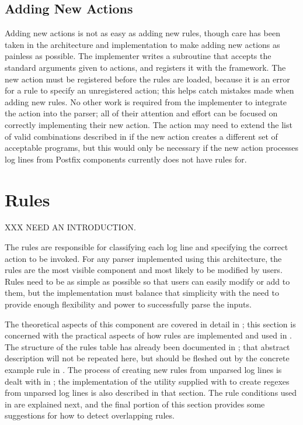 \subsection{Adding New Actions}

\label{adding new actions in implementation}

Adding new actions is not as easy as adding new rules, though care has been
taken in the architecture and implementation to make adding new actions as
painless as possible.  The implementer writes a subroutine that accepts the
standard arguments given to actions, and registers it with the framework.
The new action must be registered before the rules are loaded, because it
is an error for a rule to specify an unregistered action; this helps catch
mistakes made when adding new rules.  No other work is required from the
implementer to integrate the action into the parser; all of their attention
and effort can be focused on correctly implementing their new action.  The
action may need to extend the list of valid combinations described in
 if the new action creates a different
set of acceptable programs, but this would only be necessary if the new
action processes log lines from Postfix components \parsername{} currently
does not have rules for.

\section{Rules}

\label{rules in implementation}

XXX NEED AN INTRODUCTION\@.

The rules are responsible for classifying each log line and specifying the
correct action to be invoked.  For any parser implemented using this
architecture, the rules are the most visible component and most likely to
be modified by users.  Rules need to be as simple as possible so that users
can easily modify or add to them, but the implementation must balance that
simplicity with the need to provide enough flexibility and power to
successfully parse the inputs.

The theoretical aspects of this component are covered in detail in
; this section is concerned with the
practical aspects of how rules are implemented and used in \parsername{}.
The structure of the rules table has already been documented in
; that abstract description will not be repeated
here, but should be fleshed out by the concrete example rule in
.  The process of creating new
rules from unparsed log lines is dealt with in ; the implementation of the utility supplied with
\parsername{} to create regexes from unparsed log lines is also described
in that section.  The rule conditions used in \parsername{} are explained
next, and the final portion of this section provides some
suggestions for how to detect overlapping rules.

